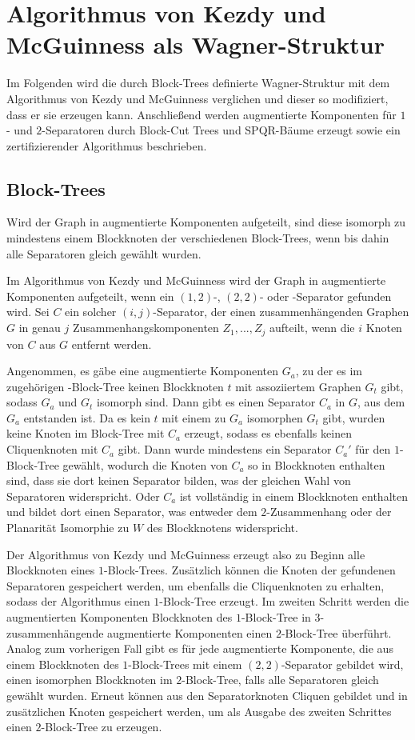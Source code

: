 \section{Algorithmus von Kezdy und McGuinness als Wagner-Struktur}
Im Folgenden wird die durch Block-Trees definierte Wagner-Struktur mit dem Algorithmus von Kezdy und McGuinness verglichen und dieser so modifiziert, dass er sie erzeugen kann.
Anschließend werden augmentierte Komponenten für $1$- und $2$-Separatoren durch Block-Cut Trees und SPQR-Bäume erzeugt sowie ein zertifizierender Algorithmus beschrieben.

\subsection{Block-Trees}
\begin{beobachtung}
  Wird der Graph in augmentierte Komponenten aufgeteilt, sind diese isomorph zu mindestens einem Blockknoten der verschiedenen Block-Trees, wenn bis dahin alle Separatoren gleich gewählt wurden.
\end{beobachtung}
Im Algorithmus von Kezdy und McGuinness wird der Graph in augmentierte Komponenten aufgeteilt, wenn ein $(1, 2)$-, $(2, 2)$- oder \dd-Separator gefunden wird.
Sei $C$ ein solcher $(i, j)$-Separator, der einen zusammenhängenden Graphen $G$ in genau $j$ Zusammenhangskomponenten $Z_1, ..., Z_j$ aufteilt, wenn die $i$ Knoten von $C$ aus $G$ entfernt werden.

Angenommen, es gäbe eine augmentierte Komponenten $G_a$, zu der es im zugehörigen \dd-Block-Tree keinen Blockknoten $t$ mit assoziiertem Graphen $G_t$ gibt, sodass $G_a$ und $G_t$ isomorph sind.
Dann gibt es einen Separator $C_a$ in $G$, aus dem $G_a$ entstanden ist.
Da es kein $t$ mit einem zu $G_a$ isomorphen $G_t$ gibt, wurden keine Knoten im Block-Tree mit $C_a$ erzeugt, sodass es ebenfalls keinen Cliquenknoten mit $C_a$ gibt.
Dann wurde mindestens ein Separator $C_a'$ für den $1$-Block-Tree gewählt, wodurch die Knoten von $C_a$ so in Blockknoten enthalten sind, dass sie dort keinen Separator bilden, was der gleichen Wahl von Separatoren widerspricht.
Oder $C_a$ ist vollständig in einem Blockknoten enthalten und bildet dort einen Separator, was entweder dem $2$-Zusammenhang oder der Planarität \bzw Isomorphie zu $W$ des Blockknotens widerspricht.

Der Algorithmus von Kezdy und McGuinness erzeugt also zu Beginn alle Blockknoten eines $1$-Block-Trees.
Zusätzlich können die Knoten der gefundenen Separatoren gespeichert werden, um ebenfalls die Cliquenknoten zu erhalten, sodass der Algorithmus einen $1$-Block-Tree erzeugt.
Im zweiten Schritt werden die augmentierten Komponenten \bzw Blockknoten des $1$-Block-Tree in $3$-zusammenhängende augmentierte Komponenten \bzw einen $2$-Block-Tree überführt.
Analog zum vorherigen Fall gibt es für jede augmentierte Komponente, die aus einem Blockknoten des $1$-Block-Trees mit einem $(2, 2)$-Separator gebildet wird, einen isomorphen Blockknoten im $2$-Block-Tree, falls alle Separatoren gleich gewählt wurden.
Erneut können aus den Separatorknoten Cliquen gebildet und in zusätzlichen Knoten gespeichert werden, um als Ausgabe des zweiten Schrittes einen $2$-Block-Tree zu erzeugen.

